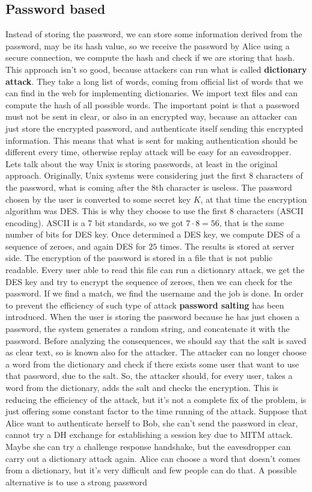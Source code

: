 \documentclass[11pt]{article}
\begin{document}
\subsection{Password based}
Instead of storing the password, we can store some information derived from the password, may be its hash value, so we receive the password by Alice using a secure connection, we compute the hash and check if we are storing that hash. This approach isn't so good, because attackers can run what is called \textbf{dictionary attack}. They take a long list of words, coming from official list of words that we can find in the web for implementing dictionaries. We import text files and can compute the hash of all possible words. The important point is that a password must not be sent in clear, or also in an encrypted way, because an attacker can just store the encrypted password, and authenticate itself sending this encrypted information. This means that what is sent for making authentication should be different every time, otherwise replay attack will be easy for an eavesdropper. Lets talk about the way Unix is storing passwords, at least in the original approach. Originally, Unix systems were considering just the first $8$ characters of the password, what is coming after the 8th character is useless. The password chosen by the user is converted to some secret key $K$, at that time the encryption algorithm was DES. This is why they choose to use the first 8 characters (ASCII encoding). ASCII is a 7 bit standards, so we got $7 \cdot 8 = 56$, that is the same number of bits for DES key. Once determined a DES key, we compute DES of a sequence of zeroes, and again DES for $25$ times. The results is stored at server side. The encryption of the password is stored in a file that is not public readable. Every user able to read this file can run a dictionary attack, we get the DES key and try to encrypt the sequence of zeroes, then we can check for the password. If we find a match, we find the username and the job is done. In order to prevent the efficiency of such type of attack \textbf{password salting} has been introduced. When the user is storing the password because he has just chosen a password, the system generates a random string, and concatenate it with the password. Before analyzing the consequences, we should say that the salt is saved as clear text, so is known also for the attacker. The attacker can no longer choose a word from the dictionary and check if there exists some user that want to use that password, due to the salt. So, the attacker should, for every user, takes a word from the dictionary, adds the salt and checks the encryption. This is reducing the efficiency of the attack, but it's not a complete fix of the problem, is just offering some constant factor to the time running of the attack. Suppose that Alice want to authenticate herself to Bob, she can't send the password in clear, cannot try a DH exchange for establishing a session key due to MITM attack. Maybe she can try a challenge response handshake, but the eavesdropper can carry out a dictionary attack again. Alice can choose a word that doesn't comes from a dictionary, but it's very difficult and few people can do that. A possible alternative is to use a strong password 
\end{document}
